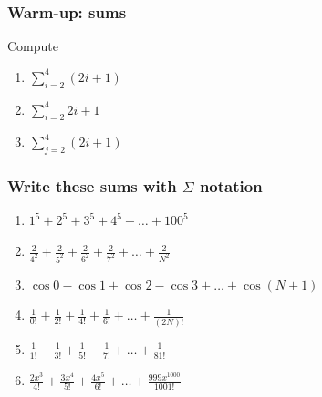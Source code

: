 \documentclass[14pt]{beamer}
\date{}
\title{}
\author{}
\newcommand {\DS} [1] {${\displaystyle #1}$}
\newcommand{\setsize}[1]{\fontsize{#1}{#1}\selectfont} %
\newcommand{\smallerfont}{\setsize{13}} %
\begin{document}

\begin{frame}[t]
\frametitle{Warm-up: sums}

Compute

\begin{enumerate}
	\item		\DS{\sum_{i=2}^{4}  (2i+1)}
\vfill
	\item		\DS{\sum_{i=2}^4 2i + 1}
\vfill
	\item		\DS{\sum_{j=2}^4 (2i + 1)}
\vfill
\end{enumerate}

\end{frame}
\begin{frame}[t]
\smallerfont
\frametitle{Write these sums with $\Sigma$ notation}

\begin{enumerate}
\item  \DS{1^5 + 2^5 + 3^5 + 4^5 + \ldots + 100^5}
\vfill
\item  \DS{\frac{2}{4^2} + \frac{2}{5^2} + \frac{2}{6^2} + \frac{2}{7^2} + \ldots + \frac{2}{N^2}}
\vfill
\item  \DS{\cos 0 - \cos 1 + \cos 2 - \cos 3 + %
	 \ldots \pm \cos (N+1)}
\vfill
 \item \DS{\frac{1}{0!} + \frac{1}{2!} + \frac{1}{4!} + \frac{1}{6!} + \ldots + \frac{1}{(2N)!}}
\vfill
\item \DS{\frac{1}{1!} - \frac{1}{3!} + \frac{1}{5!} - \frac{1}{7!} + \ldots + \frac{1}{81!}}
\vfill
 \item \DS{ \frac{2x^3}{ 4!} + \frac{3x^4}{5!} + \frac{4x^5}{6!} + \ldots + \frac{999x^{1000}}{1001!}}
\end{enumerate}

\end{frame}
\end{document}

